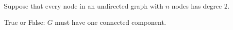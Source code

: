 \begin{prob}
    Suppose that every node in an undirected graph with $n$ nodes has degree 2.

    True or False: $G$ must have one connected component.

    \tF{}
\end{prob}
